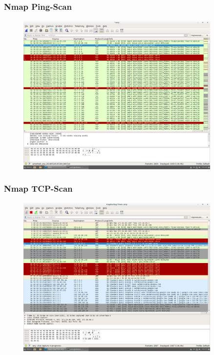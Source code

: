 \documentclass[12pt]{article}
\theoremstyle{plain}
\begin{document}
\subsubsection*{Nmap Ping-Scan}
\begin{figure}[!ht]
	\centering
     \includegraphics[width=0.9\textwidth]{Bilder/nmap_ping_scan.png}
\end{figure}
\newpage

\subsubsection*{Nmap TCP-Scan}
\begin{figure}[!ht]
	\centering
     \includegraphics[width=0.9\textwidth]{Bilder/nmap_tcp_scan.png}
\end{figure}
\newpage
\end{document}
